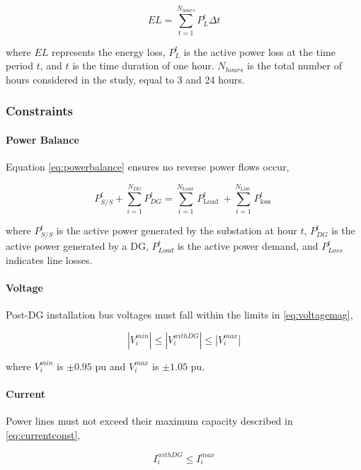 \documentclass[conference]{IEEEtran}
\begin{document}
\begin{equation}
	EL= \sum_{t=1}^{N_{hours}}  P_{L}^t \Delta t
	\label{eq:min_energyloss}
\end{equation}

where $EL$ represents the energy loss, $P_L^t$ is the active power loss at the time period $t$, and $t$ is the time duration of one hour. $N_{hours}$ is the total number of hours considered in the study, equal to 3 and 24 hours.


\subsubsection{Constraints}
\paragraph{Power Balance}
Equation \eqref{eq:powerbalance} ensures no reverse power flows occur,

\begin{equation}
	P_{S / S}^t+\sum_{i=1}^{N_{D G}} P_{D G}^t=\sum_{i=1}^{N_{\text {Load }}} P_{\text {Load }}^t+\sum_{i=1}^{N_{\text {Line }}} P_{\text {loss }}^t
	\label{eq:powerbalance}
\end{equation}

where $P_{S/S}^t$ is the active power generated by the substation at hour $t$, $P_{DG}^t$ is the active power generated by a DG, $P_{Load}^t$ is the  active power demand, and $P_{Loss}^t$ indicates line losses. 

\paragraph{Voltage}
Post-DG installation bus voltages must fall within the limits in \eqref{eq:voltagemag},

\begin{equation}
	\left|V_{i}^{m i n}\right|\leq\left|V_{i}^{withDG}\right|\leq\left|V_{i}^{m a x}\right|
	\label{eq:voltagemag}
\end{equation}

where \(V_i^{min}\) is $\pm 0.95$ pu and \(V_i^{max}\) is $\pm 1.05$ pu.

\paragraph{Current}
Power lines must not exceed their maximum capacity described in \eqref{eq:currentconst},

\begin{equation}
	I_{i}^{withDG} \leq I_{i}^{max}
	\label{eq:currentconst}
\end{equation}
\end{document}
